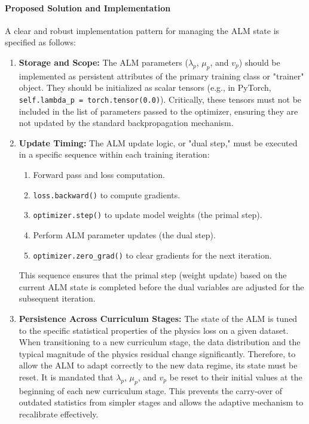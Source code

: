 \paragraph{Proposed Solution and Implementation}
A clear and robust implementation pattern for managing the ALM state is specified as follows:
\begin{enumerate}
    \item \textbf{Storage and Scope:} The ALM parameters ($\lambda_p$, $\mu_p$, and $v_p$) should be implemented as persistent attributes of the primary training class or "trainer" object. They should be initialized as scalar tensors (e.g., in PyTorch, \texttt{self.lambda\_p = torch.tensor(0.0)}). Critically, these tensors must not be included in the list of parameters passed to the optimizer, ensuring they are not updated by the standard backpropagation mechanism.
    \item \textbf{Update Timing:} The ALM update logic, or "dual step," must be executed in a specific sequence within each training iteration:
    \begin{enumerate}
        \item Forward pass and loss computation.
        \item \texttt{loss.backward()} to compute gradients.
        \item \texttt{optimizer.step()} to update model weights (the primal step).
        \item Perform ALM parameter updates (the dual step).
        \item \texttt{optimizer.zero\_grad()} to clear gradients for the next iteration.
    \end{enumerate}
    This sequence ensures that the primal step (weight update) based on the current ALM state is completed before the dual variables are adjusted for the subsequent iteration.
    \item \textbf{Persistence Across Curriculum Stages:} The state of the ALM is tuned to the specific statistical properties of the physics loss on a given dataset. When transitioning to a new curriculum stage, the data distribution and the typical magnitude of the physics residual change significantly. Therefore, to allow the ALM to adapt correctly to the new data regime, its state must be reset. It is mandated that $\lambda_p$, $\mu_p$, and $v_p$ be reset to their initial values at the beginning of each new curriculum stage. This prevents the carry-over of outdated statistics from simpler stages and allows the adaptive mechanism to recalibrate effectively.
\end{enumerate}

